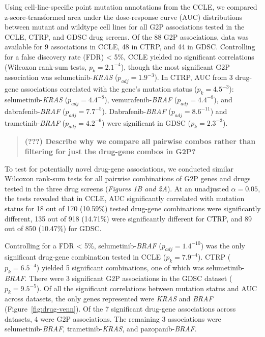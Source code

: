 \documentclass[man,floatsintext]{apa6}
\begin{document}
Using cell-line-specific point mutation annotations from the CCLE, we
compared z-score-transformed area under the dose-response curve (AUC)
distributions between mutant and wildtype cell lines for all G2P
associations tested in the CCLE, CTRP, and GDSC drug screens. Of the 88
G2P associations, data was available for 9 associations in CCLE, 48 in
CTRP, and 44 in GDSC. Controlling for a false discovery rate (FDR)
\textless{} 5\%, CCLE yielded no significant correlations (Wilcoxon
rank-sum tests, \(p_k = 2.1^{-4}\)), though the most significant G2P
association was selumetinib-\emph{KRAS} (\(p_{adj} = 1.9^{-3}\)). In
CTRP, AUC from 3 drug-gene associations correlated with the gene's
mutation status (\(p_k = 4.5^{-3}\)): selumetinib-\emph{KRAS}
(\(p_{adj} = 4.4^{-8}\)), vemurafenib-\emph{BRAF}
(\(p_{adj} = 4.4^{-8}\)), and dabrafenib-\emph{BRAF}
(\(p_{adj} = 7.7^{-5}\)). Dabrafenib-\emph{BRAF}
(\(p_{adj} = 8.6^{-11}\)) and trametinib-\emph{BRAF}
(\(p_{adj} = 4.2^{-6}\)) were significant in GDSC (\(p_k = 2.3^{-3}\)).

\begin{quote}
\textbf{(???) Describe why we compare all pairwise combos rather than
filtering for just the drug-gene combos in G2P?}
\end{quote}

To test for potentially novel drug-gene associations, we conducted
similar Wilcoxon rank-sum tests for all pairwise combinations of G2P
genes and drugs tested in the three drug screens (\emph{Figures 1B and
2A}). At an unadjusted \(\alpha = 0.05\), the tests revealed that in
CCLE, AUC significantly correlated with mutation status for 18 out of
170 (10.59\%) tested drug-gene combinations were significantly
different, 135 out of 918 (14.71\%) were significantly different for
CTRP, and 89 out of 850 (10.47\%) for GDSC.

Controlling for a FDR \textless{} 5\%, selumetinib-\emph{BRAF}
(\(p_{adj} = 1.4^{-10}\)) was the only significant drug-gene combination
tested in CCLE (\(p_k = 7.9^{-4}\)). CTRP (\(p_k = 6.5^{-4}\)) yielded 5
significant combinations, one of which was selumetinib-\emph{BRAF}.
There were 3 significant G2P associations in the GDSC dataset
(\(p_k = 9.5^{-5}\)). Of all the significant correlations between
mutation status and AUC across datasets, the only genes represented were
\emph{KRAS} and \emph{BRAF} (Figure~\ref{fig:drug-venn}). Of the 7
significant drug-gene associations across datasets, 4 were G2P
associations. The remaining 3 associations were selumetinib-\emph{BRAF},
trametinib-\emph{KRAS}, and pazopanib-\emph{BRAF}.
\end{document}
